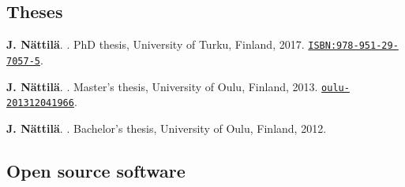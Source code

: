 \documentclass[10pt]{article}
\begin{document}
\newpage
\subsection*{\phantom{sub} Theses}

\vspace{-20pt}
%
\begin{thebibliography}{3}
\vspace{-5pt}

\textbf{J. N\"attil\"a}.
.
\newblock PhD thesis, University of Turku, Finland, 2017. \href{http://urn.fi/URN:ISBN:978-951-29-7057-5}{\nolinkurl{ISBN:978-951-29-7057-5}}.

\textbf{J. N\"attil\"a}.
.
\newblock Master's thesis, University of Oulu, Finland, 2013. \href{http://urn.fi/URN:NBN:fi:oulu-201312041966}{\nolinkurl{oulu-201312041966}}.

\textbf{J. N\"attil\"a}.
.
\newblock Bachelor's thesis, University of Oulu, Finland, 2012.

\end{thebibliography}

\vspace{-5pt}
\subsection*{\phantom{sub} Open source software}
\end{document}
